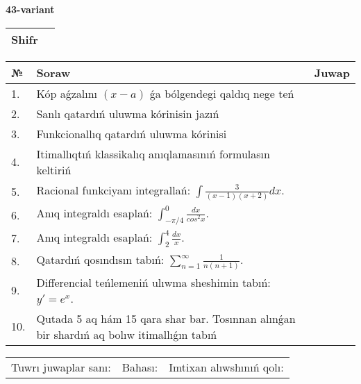 \documentclass{article}
\begin{document}
  \egroup
  
  \newpage
  
  
  \textbf{43-variant}\\
  
  \bgroup
  \def\arraystretch{1.6} %
  
  \begin{tabular}{|m{5.7cm}|m{9.5cm}|}
  \hline
  Shifr & \\
  \hline
  \end{tabular}
  
  \vspace{1cm}
  
  \begin{tabular}{|m{0.7cm}|m{10cm}|m{4cm}|}
  \hline
  № & Soraw & Juwap \\
  \hline
  1. & Kóp aǵzalını \((x - a)\) ǵa bólgendegi qaldıq nege teń &  \\
  \hline
  2. & Sanlı qatardıń uluwma kórinisin jazıń &  \\
  \hline
  3. & Funkcionallıq qatardıń uluwma kórinisi &  \\
  \hline
  4. & Itimallıqtıń klassikalıq anıqlamasınıń formulasın keltiriń &  \\
  \hline
  5. & Racional funkciyanı integrallań: \(\int{\frac{3}{(x - 1)(x + 2)}dx}\). &  \\
  \hline
  6. & Anıq integraldı esaplań: \(\int_{- \pi/4}^{0}\frac{dx}{cos^2 x}\). &  \\
  \hline
  7. & Anıq integraldı esaplań: \(\int_{2}^{4}\frac{dx}{x}\). &  \\
  \hline
  8. & Qatardıń qosındısın tabıń: \(\sum_{n = 1}^{\infty}\frac{1}{n(n + 1)}\). &  \\
  \hline
  9. & Differencial teńlemeniń ulıwma sheshimin tabıń: \(y' = e^{x}\). &  \\
  \hline
  10. & Qutada 5 aq hám 15 qara shar bar. Tosınnan alınǵan bir shardıń aq bolıw itimallıǵın tabıń &  \\
  \hline
  \end{tabular}
  
  \vspace{1cm}
  
  \begin{tabular}{lll}
  Tuwrı juwaplar sanı: \underline{\hspace{1.5cm}} & 
  Bahası: \underline{\hspace{1.5cm}} & 
  Imtixan alıwshınıń qolı: \underline{\hspace{2cm}} \\
  \end{tabular}
  
\end{document}
